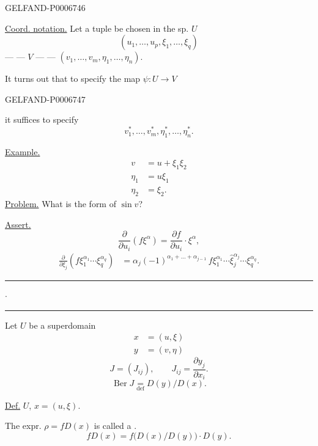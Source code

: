 \begin{GelfandAdjacentEvidence}{GELFAND-P000674}{6}


\underline{Coord. notation.} Let a tuple be chosen in the sp. \(U\)
\[
(u_1,\ldots,u_p,\xi_1,\ldots,\xi_q)
\]
\hspace*{2em}--- \textquotedbl{} --- \(V\) --- \textquotedbl{} ---
\((v_1,\ldots,v_m,\eta_1,\ldots,\eta_n)\).

It turns out that to specify the map \(\psi:U\to V\)
\end{GelfandAdjacentEvidence}
\begin{GelfandAdjacentEvidence}{GELFAND-P000674}{7}

it suffices to specify
\[
v_1^*,\ldots,v_m^*,\eta_1^*,\ldots,\eta_n^*.
\]

\underline{Example.}
\[
\begin{aligned}
v&=u+\xi_1\xi_2\\
\eta_1&=u\xi_1\\
\eta_2&=\xi_2.
\end{aligned}
\]
\underline{Problem.} What is the form of \(\sin v\)?

\underline{Assert.}
\[
\frac{\partial}{\partial u_i}(f\xi^\alpha)
=\frac{\partial f}{\partial u_i}\cdot\xi^\alpha,
\]
\[
\begin{aligned}
\frac{\partial}{\partial\xi_j}
  (f\xi_1^{\alpha_1}\cdots\xi_q^{\alpha_q})
&=\alpha_j(-1)^{\alpha_1+\ldots+\alpha_{j-1}}\,
  f\xi_1^{\alpha_1}\cdots\widehat{\xi}_j^{\alpha_j}\cdots\xi_q^{\alpha_q}.
\end{aligned}
\]
\end{GelfandAdjacentEvidence}


\noindent\rule{23mm}{.45pt}\enspace\(\cdot\)\enspace\rule{17mm}{.45pt}

Let \(U\) be a superdomain
\[
\begin{aligned}
x&=(u,\xi)\\
y&=(v,\eta)
\end{aligned}
\]
\[
J=(J_{ij}),\qquad J_{ij}=\frac{\partial y_j}{\partial x_i}.
\]
\[
\operatorname{Ber}J\underset{\mathrm{def}}{=}D(y)/D(x).
\]

\underline{Def.} \(U\), \(x=(u,\xi)\).

The expr. \(\rho=fD(x)\) is called a .
\[
fD(x)=f\bigl(D(x)/D(y)\bigr)\cdot D(y).
\]

